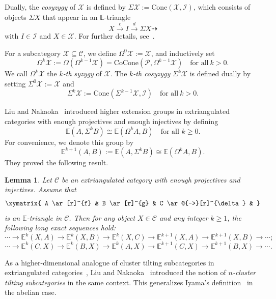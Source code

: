 \documentclass[a4paper,reqno,11pt]{amsart}
\newtheorem{lemma}[theorem]{Lemma}
\theoremstyle{definition}
\def \text{\mbox}
\begin{document}
Dually, the \emph{cosyzygy} of $\mathcal{X}$ is defined by $\Sigma \mathcal{X} := \mathrm{Cone}(\mathcal{X}, \mathcal{I})$, which consists of objects $\Sigma X$ that appear in an $\mathbb{E}$-triangle
\[
X \overset{c}{\longrightarrow} I \overset{d}{\longrightarrow} \Sigma X \overset{}{\dashrightarrow}
\]
with $I \in \mathcal{I}$ and $X \in \mathcal{X}$. For further details, see~\cite[Definition~4.2 and Proposition~4.3]{LN}.

For a subcategory $\mathcal{X} \subseteq \mathcal{C}$, we define $\Omega^0 \mathcal{X} := \mathcal{X}$, and inductively set
\[
\Omega^k \mathcal{X} := \Omega(\Omega^{k-1} \mathcal{X}) = \mathrm{CoCone}(\mathcal{P}, \Omega^{k-1} \mathcal{X})
\quad \text{for all}~ k > 0.
\]
We call $\Omega^k \mathcal{X}$ the \emph{$k$-th syzygy} of $\mathcal{X}$. The \emph{$k$-th cosyzygy} $\Sigma^k \mathcal{X}$ is defined dually by setting $\Sigma^0 \mathcal{X} := \mathcal{X}$ and
\[
\Sigma^k \mathcal{X} := \mathrm{Cone}(\Sigma^{k-1} \mathcal{X}, \mathcal{I})
\quad\text{for all}~ k > 0.
\]

Liu and Nakaoka~\cite{LN} introduced higher extension groups in extriangulated categories with enough projectives and enough injectives by defining
\[
\mathbb{E}(A, \Sigma^k B) \cong \mathbb{E}(\Omega^k A, B) \quad \text{for all } k \geq 0.
\]
For convenience, we denote this group by
\[
\mathbb{E}^{k+1}(A, B) := \mathbb{E}(A, \Sigma^k B) \cong \mathbb{E}(\Omega^k A, B).
\]
They proved the following result.

\begin{lemma}\label{2}
Let $\mathcal{C}$ be an extriangulated category with enough projectives and injectives. Assume that
\[
\xymatrix{
A \ar[r]^{f} & B \ar[r]^{g} & C \ar@{-->}[r]^{\delta} &
}
\]
is an $\mathbb{E}$-triangle in $\mathcal{C}$. Then for any object $X \in \mathcal{C}$ and any integer $k \geq 1$, the following long exact sequences hold:
\[
\cdots \rightarrow \mathbb{E}^k(X, A) \rightarrow \mathbb{E}^k(X, B) \rightarrow \mathbb{E}^k(X, C)
\rightarrow \mathbb{E}^{k+1}(X, A) \rightarrow \mathbb{E}^{k+1}(X, B) \rightarrow \cdots;
\]
\[
\cdots \rightarrow \mathbb{E}^k(C, X) \rightarrow \mathbb{E}^k(B, X) \rightarrow \mathbb{E}^k(A, X)
\rightarrow \mathbb{E}^{k+1}(C, X) \rightarrow \mathbb{E}^{k+1}(B, X) \rightarrow \cdots.
\]
\end{lemma}

As a higher-dimensional analogue of cluster tilting subcategories in extriangulated categories~\cite[Definition~4.1]{CZZ}, Liu and Nakaoka~\cite[Definition~5.3]{LN} introduced the notion of \emph{$n$-cluster tilting subcategories} in the same context. This generalizes Iyama's definition~\cite[Definition~1.1]{I} in the abelian case.
\end{document}
